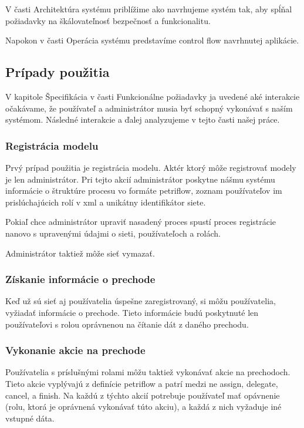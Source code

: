 V časti Architektúra systému priblížime ako navrhujeme systém tak, aby spĺňal požiadavky na škálovateľnosť bezpečnosť a funkcionalitu.

Napokon v časti Operácia systému predstavíme control flow navrhnutej aplikácie.


\subsection{Prípady použitia} \label{usecases}
V kapitole Špecifikácia v časti Funkcionálne požiadavky ja uvedené aké interakcie očakávame, že používateľ a administrátor musia byť schopný vykonávať s naším systémom. Následné interakcie a ďalej analyzujeme v tejto časti našej práce. 

\subsubsection{Registrácia modelu}
Prvý prípad použitia je registrácia modelu. Aktér ktorý môže registrovať modely je len administrátor. Pri tejto akcií administrátor poskytne nášmu systému informácie o štruktúre procesu vo formáte petriflow, zoznam používateľov im prislúchajúcich rolí v \acrshort{xml} a unikátny identifikátor siete.

Pokiaľ chce administrátor upraviť nasadený proces spustí proces registrácie nanovo s upravenými údajmi o sieti, používateľoch a rolách.

Administrátor taktiež môže sieť vymazať.

\subsubsection{Získanie informácie o prechode}
Keď už sú sieť aj používatelia úspešne zaregistrovaný, si môžu používatelia, vyžiadať informácie o prechode. Tieto informácie budú poskytnuté len používateľovi s rolou oprávnenou na čítanie dát z daného prechodu.

\subsubsection{Vykonanie akcie na prechode}
Používatelia s príslušnými rolami môžu taktiež vykonávať akcie na prechodoch. Tieto akcie vyplývajú z definície petriflow a patrí medzi ne assign, delegate, cancel, a finish. Na každú z týchto akcií potrebuje používateľ mať opávnenie (rolu, ktorá je oprávnená vykonávať túto akciu), a každá z nich vyžaduje iné vstupné dáta.

